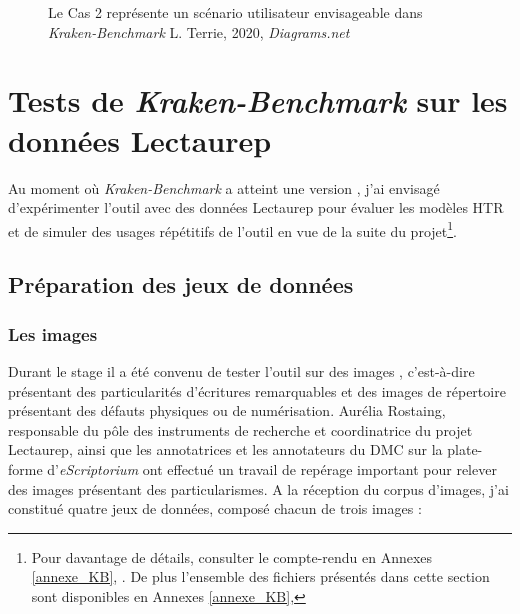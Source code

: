 \begin{figure}[h!]
    \centering
    \centerline{}
    \caption{Le Cas 2 représente un scénario utilisateur envisageable dans \textit{Kraken-Benchmark} \textcopyright L. Terrie, 2020, \textit{Diagrams.net}}
    \label{fig:TEI-KB}
\end{figure}

\thispagestyle{empty}
\chapter{Tests de \textit{Kraken-Benchmark} sur les données Lectaurep}\label{tests_KB_lectaurep}

Au moment où \textit{Kraken-Benchmark} a atteint une version , j'ai envisagé d'expérimenter l'outil avec des données Lectaurep pour évaluer les modèles HTR et de simuler des usages répétitifs de l'outil en vue de la suite du projet\footnote{Pour davantage de détails, consulter le compte-rendu en Annexes \ref{annexe_KB}, . De plus l'ensemble des fichiers présentés dans cette section sont disponibles en Annexes \ref{annexe_KB}, }.

\section{Préparation des jeux de données} 

\subsection{Les images} 
Durant le stage il a été convenu de tester l'outil sur des images , c'est-à-dire présentant des particularités d'écritures remarquables et des images de répertoire présentant des défauts physiques ou de numérisation. Aurélia Rostaing, responsable du pôle des instruments de recherche et coordinatrice du projet Lectaurep, ainsi que les annotatrices et les annotateurs du DMC sur la plate-forme d'\textit{eScriptorium} ont effectué un travail de repérage important pour relever des images présentant des particularismes. A la réception du corpus d'images, j'ai constitué quatre jeux de données, composé chacun de trois images :

